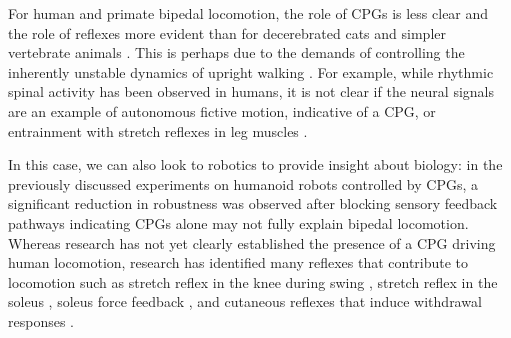 For human and primate bipedal locomotion, the role of CPGs is less clear and
the role of reflexes more evident than for decerebrated cats and simpler
vertebrate animals \citep{mackay2002central, vaughan2003theories,
nielsen2003we}. This is perhaps due to the demands of controlling the inherently
unstable dynamics of upright walking \citep{capaday2002special}. For example,
while rhythmic spinal activity has been observed in humans, it is not clear if
the neural signals are an example of autonomous fictive motion, indicative of a
CPG, or entrainment with stretch reflexes in leg muscles
\citep{capaday2002special, stewart1991modulation}. 

In this case, we can also look to robotics to provide insight about biology: in
the previously discussed experiments on humanoid robots controlled by CPGs, a
significant reduction in robustness was observed after blocking sensory feedback
pathways \citep{endo2005experimental, righetti2006programmable} indicating CPGs
alone may not fully explain bipedal locomotion. Whereas research has not yet
clearly established the presence of a CPG driving human locomotion, research has
identified many reflexes that contribute to locomotion such as stretch reflex in
the knee during swing \citep{garrett1983role}, stretch reflex in the soleus
\citep{yang1991contribution}, soleus force feedback \citep{grey2007positive},
and cutaneous reflexes that induce withdrawal responses \citep{yang1990phase}. 

